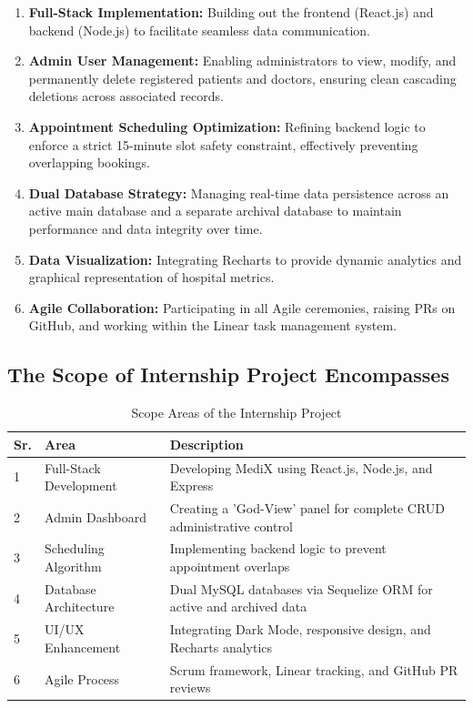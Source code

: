\documentclass[12pt,a4paper]{article}
\begin{document}
\begin{enumerate}
    \item \textbf{Full-Stack Implementation:} Building out the frontend (React.js) and backend (Node.js) to facilitate seamless data communication.
    \item \textbf{Admin User Management:} Enabling administrators to view, modify, and permanently delete registered patients and doctors, ensuring clean cascading deletions across associated records.
    \item \textbf{Appointment Scheduling Optimization:} Refining backend logic to enforce a strict 15-minute slot safety constraint, effectively preventing overlapping bookings.
    \item \textbf{Dual Database Strategy:} Managing real-time data persistence across an active main database and a separate archival database to maintain performance and data integrity over time.
    \item \textbf{Data Visualization:} Integrating Recharts to provide dynamic analytics and graphical representation of hospital metrics.
    \item \textbf{Agile Collaboration:} Participating in all Agile ceremonies, raising PRs on GitHub, and working within the Linear task management system.
\end{enumerate}

\subsection{The Scope of Internship Project Encompasses}

\begin{table}[h!]
\centering
\caption{Scope Areas of the Internship Project}
\label{tab:scope}
\begin{tabular}{|p{1cm}|p{4cm}|p{8cm}|}
\hline
\textbf{Sr.} & \textbf{Area} & \textbf{Description} \\
\hline
1 & Full-Stack Development & Developing MediX using React.js, Node.js, and Express \\
\hline
2 & Admin Dashboard & Creating a 'God-View' panel for complete CRUD administrative control \\
\hline
3 & Scheduling Algorithm & Implementing backend logic to prevent appointment overlaps \\
\hline
4 & Database Architecture & Dual MySQL databases via Sequelize ORM for active and archived data \\
\hline
5 & UI/UX Enhancement & Integrating Dark Mode, responsive design, and Recharts analytics \\
\hline
6 & Agile Process & Scrum framework, Linear tracking, and GitHub PR reviews \\
\hline
\end{tabular}
\end{table}
\end{document}
